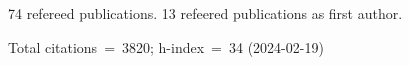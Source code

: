 74 refereed publications. 13 refeered publications as first author.

Total citations~=~3820; h-index~=~34 (2024-02-19)